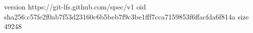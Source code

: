 version https://git-lfs.github.com/spec/v1
oid sha256:c57fe2f0ab7f53d23160c6b5beb7f9c3be1fff7cca7159853f6ffacfda6f814a
size 49248
